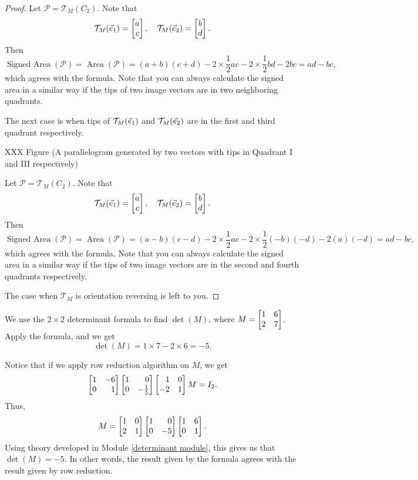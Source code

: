 \begin{proof}
	Let $\mathcal{P}=\mathcal{T}_{M}(C_{2})$. Note that
	\[
		\mathcal{T}_{M}({\vec e_1})= \begin{bmatrix}a \\ c\end{bmatrix},\quad \mathcal{T}_{M}({\vec e_2})=\begin{bmatrix}b \\ d\end{bmatrix}.
	\]
	Then
	\[
		\operatorname{Signed~Area}(\mathcal{P})=\operatorname{Area}(\mathcal{P})=(a+b)(c+d)-2\times \frac{1}{2}ac-2\times \frac{1}{2}bd-2bc=ad-bc,
	\]
	which agrees with the formula. Note that you can always calculate the signed
	area in a similar way if the tips of two image vectors are in two neighboring
	quadrants.

	The next case is when tips of $\mathcal{T}_{M}({\vec e_1})$ and $\mathcal{T}_{M}({\vec e_2}
	)$ are in the first and third quadrant respectively.

	XXX Figure (A parallelogram generated by two vectors with tips in Quadrant I
	and III respectively)

	Let $\mathcal{P}=\mathcal{T}_{M}(C_{2})$. Note that
	\[
		\mathcal{T}_{M}({\vec e_1})= \begin{bmatrix}a \\ c\end{bmatrix},\quad \mathcal{T}_{M}({\vec e_2})=\begin{bmatrix}b \\ d\end{bmatrix}.
	\]
	Then
	\[
		\operatorname{Signed~Area}(\mathcal{P})=\operatorname{Area}(\mathcal{P})=(a-b)(c-d)-2\times \frac{1}{2}ac-2\times \frac{1}{2}(-b)(-d)-2(a)(-d)=ad-bc,
	\]
	which agrees with the formula. Note that you can always calculate the signed
	area in a similar way if the tips of two image vectors are in the second and
	fourth quadrants respectively.

	The case when $\mathcal{T}_{M}$ is orientation reversing is left to you.
\end{proof}
\begin{example}
	We use the $2\times 2$ determinant formula to find $\det(M)$, where
	$M=\mat{1 & 6 \\ 2 & 7}$. Apply the formula, and we get
	\[
		\det(M)=1\times 7-2\times 6=-5.
	\]
\end{example}
Notice that if we apply row reduction algorithm on $M$, we get
\[
	\mat{1 & -6 \\ 0 & 1}\mat{1 & 0 \\ 0 & -\frac{1}{5}}\mat{1 & 0 \\ -2 & 1}M=I_{2}.
\]
Thus,
\[
	M=\mat{1 & 0 \\ 2 & 1}\mat{1 & 0 \\ 0 & -5}\mat{1 & 6 \\ 0 & 1}.
\]
Using theory developed in Module \ref{determinant module}, this gives us that
$\det(M)=-5$. In other words, the result given by the formula agrees with the
result given by row reduction.

